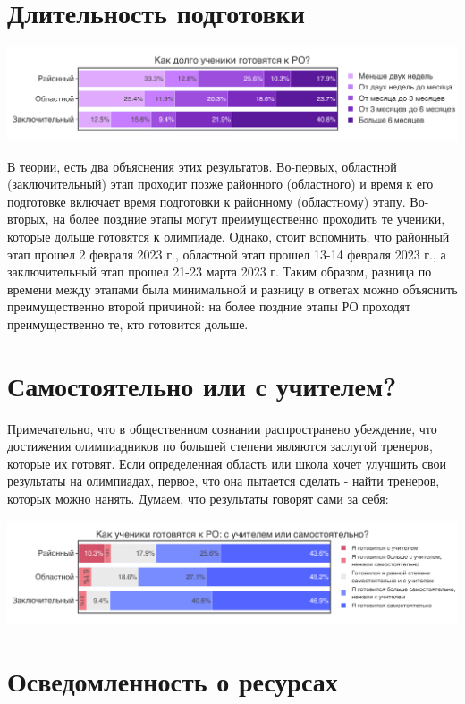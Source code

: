 \section{Длительность подготовки}

\includegraphics[width=\linewidth]{../export/pdf/demographics/preptime.pdf}

В теории, есть два объяснения этих результатов. Во-первых, областной (заключительный) этап проходит позже районного (областного) и время к его подготовке включает время подготовки к районному (областному) этапу. Во-вторых, на более поздние этапы могут преимущественно проходить те ученики, которые дольше готовятся к олимпиаде. Однако, стоит вспомнить, что районный этап прошел 2 февраля 2023 г., областной этап прошел 13-14 февраля 2023 г., а заключительный этап прошел 21-23 марта 2023 г. Таким образом, разница по времени между этапами была минимальной и разницу в ответах можно объяснить преимущественно второй причиной: на более поздние этапы РО проходят преимущественно те, кто готовится дольше.

\section{Самостоятельно или с учителем?}
Примечательно, что в общественном сознании распространено убеждение, что достижения олимпиадников по большей степени являются заслугой тренеров, которые их готовят. Если определенная область или школа хочет улучшить свои результаты на олимпиадах, первое, что она пытается сделать - найти тренеров, которых можно нанять. Думаем, что результаты говорят сами за себя:

\includegraphics[width=\linewidth]{../export/pdf/demographics/prepstyle.pdf}


\section{Осведомленность о ресурсах}

